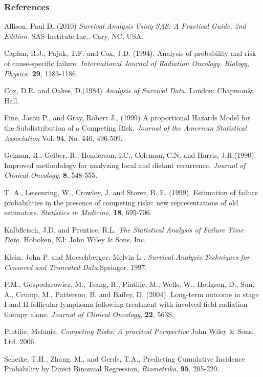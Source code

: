 \documentclass{beamer}[10]
\begin{document}
\begin{frame}[allowframebreaks]
  \frametitle<presentation>{References}
    
\begin{thebibliography}{10}
%    
  \beamertemplatebookbibitems

Allison, Paul D. (2010) \emph{Survival Analysis Using SAS: A Practical Guide, 2nd Edition}. SAS Institute Inc., Cary, NC, USA.

Caplan, R.J., Pajak, T.F. and Cox, J.D. (1994). Analysis of probability and risk of cause-specific failure. \emph{International Journal of Radiation Oncology.} \emph{Biology, Physics.} {\bf 29}, 1183-1186.

Cox, D.R. and Oakes, D.(1984) \emph{Analysis of Survival Data.} London: Chapman$\&$ Hall.

Fine, Jason P., and Gray, Robert J., (1999) A proportional Hazards Model for the Subdistribution of a Competing Risk. \emph{Journal of the American Statistical Association} Vol. 94, No. 446,  496-509.

 Gelman, R., Gelber, R., Henderson, I.C., Coleman, C.N. and Harris, J.R.(1990). Improved methodology for analyzing local and distant recurrence. \emph{Journal of Clinical Oncology}. {\bf 8}, 548-555.

 T. A., Leisenring, W., Crowley, J. and Storer, B. E. (1999). Estimation of failure probabilities in the presence of competing risks: new representations of old estimators. \emph{Statistics in Medicine, }{\bf 18}, 695-706.

 Kalbfleisch, J.D. and Prentice, R.L. \emph{The Statistical Analysis of Failure Time Data.} Hoboken, NJ: John Wiley $\&$ Sons, Inc.

 Klein, John P. and Moeschberger, Melvin L . \emph{Survival Analysis Techniques for Censored and Truncated Data} Springer. 1997.

 P.M., Gospodarowicz, M., Tsang, R., Pintilie, M., Wells, W., Hodgson, D., Sun, A., Crump, M., Patterson, B. and Bailey, D. (2004). Long-term outcome in stage I and II follicular lymphoma following treatment with involved field radiation therapy alone. \emph{Journal of Clinical Oncology}, {\bf 22}, 563S.

 Pintilie, Melania. \emph{Competing Risks: A practical Perspective} John Wiley $\&$ Sons, Ltd. 2006.

Scheike, T.H., Zhang, M., and Gerds, T.A., Predicting Cumulative Incidence Probability by Direct Binomial Regression, \emph{Biometrika}, {\bf 95}, 205-220.


\end{thebibliography}
\end{frame}
\end{document}
